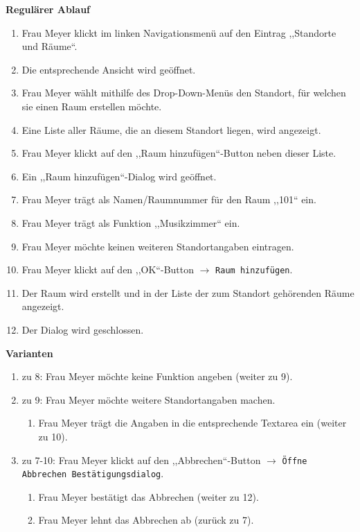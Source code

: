 \documentclass[fontsize=12pt,paper=a4,twoside]{scrartcl}
\begin{document}
\textbf{Regulärer Ablauf}
\begin{enumerate}
\item Frau Meyer klickt im linken Navigationsmenü auf den Eintrag ,,Standorte und Räume``.
\item Die entsprechende Ansicht wird geöffnet.
\item Frau Meyer wählt mithilfe des Drop-Down-Menüs den Standort, für welchen sie einen Raum erstellen möchte.
\item Eine Liste aller Räume, die an diesem Standort liegen, wird angezeigt.
\item Frau Meyer klickt auf den ,,Raum hinzufügen``-Button neben dieser Liste.
\item Ein ,,Raum hinzufügen``-Dialog wird geöffnet.
\item Frau Meyer trägt als Namen/Raumnummer für den Raum ,,101`` ein.
\item Frau Meyer trägt als Funktion ,,Musikzimmer`` ein.
\item Frau Meyer möchte keinen weiteren Standortangaben eintragen.
\item Frau Meyer klickt auf den ,,OK``-Button $\rightarrow$ \texttt{Raum hinzufügen}.
\item Der Raum wird erstellt und in der Liste der zum Standort gehörenden Räume angezeigt.
\item Der Dialog wird geschlossen.
\end{enumerate}
\vspace{5pt}

\textbf{Varianten}
\begin{enumerate}
\item zu 8: Frau Meyer möchte keine Funktion angeben (weiter zu 9).
\item zu 9: Frau Meyer möchte weitere Standortangaben machen. 
	\begin{enumerate}[label=\arabic*.]
	\item Frau Meyer trägt die Angaben in die entsprechende Textarea ein (weiter zu 10).
	\end{enumerate}
\item zu 7-10: Frau Meyer klickt auf den ,,Abbrechen``-Button $\rightarrow$ \texttt{Öffne Abbrechen Bestätigungsdialog}.
	\begin{enumerate}[label={\alph*.}]
	\item Frau Meyer bestätigt das Abbrechen (weiter zu 12).
	\item Frau Meyer lehnt das Abbrechen ab (zurück zu 7).
	\end{enumerate}
\end{enumerate}
\vspace{5pt}
\end{document}
